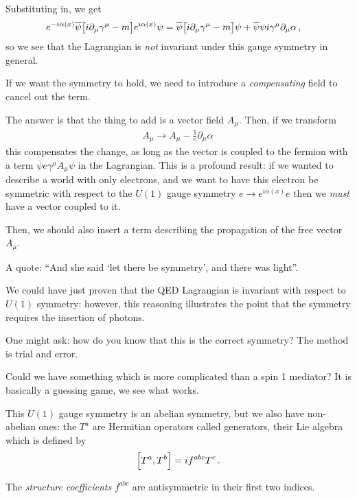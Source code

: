 \documentclass[main.tex]{subfiles}
\begin{document}
Substituting in, we get 
%
\begin{align}
e^{-i \alpha (x)} \overline{\psi} \qty[i \partial_{\mu } \gamma^{\mu } - m] e^{i \alpha (x)} \psi  
&= 
\overline{\psi} \qty[i \partial_{\mu } \gamma^{\mu } - m] \psi  
 + \overline{\psi} \psi i \gamma^{\mu }\partial_{\mu } \alpha 
\,,
\end{align}
%
so we see that the Lagrangian is \emph{not} invariant under this gauge symmetry in general. 

If we want the symmetry to hold, we need to introduce a \emph{compensating} field to cancel out the term.

The answer is that the thing to add is a vector field \(A_{\mu }\). 
Then, if we transform 
%
\begin{align}
A_{\mu } \to A_{\mu } - \frac{1}{e} \partial_{\mu } \alpha 
\,
\end{align}
%
this compensates the change, as long as the vector is coupled to the fermion with a term \(\overline{\psi} e \gamma^{\mu } A_{\mu } \psi \) in the Lagrangian. 
This is a profound result: if we wanted to describe a world with only electrons, and we want to have this electron be symmetric with respect to the \(U(1)\) gauge symmetry \(e \to e^{i \alpha (x)} e\) then we \emph{must} have a vector coupled to it. 

Then, we should also insert a term describing the propagation of the free vector \(A_{\mu }\). 

A quote: ``And she said `let there be symmetry', and there was light''.

We could have just proven that the QED Lagrangian is invariant with respect to \(U(1)\) symmetry: however, this reasoning illustrates the point that the symmetry requires the insertion of photons. 

One might ask: how do you know that this is the correct symmetry? 
The method is trial and error. 

Could we have something which is more complicated than a spin 1 mediator? It is basically a guessing game, we see what works. 

This \(U(1)\) gauge symmetry is an abelian symmetry, but we also have non-abelian ones: the \(T^{a}\) are Hermitian operators called generators, their Lie algebra which is defined by 
%
\begin{align}
\qty[T^{a}, T^{b}] = if^{abc} T^{c}
\,.
\end{align}

The \emph{structure coefficients} \(f^{abc}\) are antisymmetric in their first two indices. 
\end{document}
